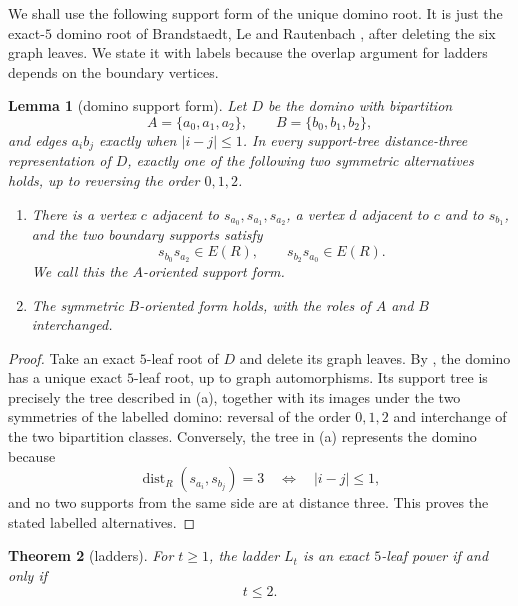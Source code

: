 \documentclass[11pt]{article}
\newtheorem{theorem}{Theorem}[section]
\newtheorem{lemma}[theorem]{Lemma}
\theoremstyle{definition}
\newcommand{\dist}{\operatorname{dist}}
\begin{document}
We shall use the following support form of the unique domino root.  It is just the exact-$5$ domino root of Brandstaedt, Le and Rautenbach \cite[Lemma~6(iii)]{BLR2010}, after deleting the six graph leaves.  We state it with labels because the overlap argument for ladders depends on the boundary vertices.

\begin{lemma}[domino support form]\label{lem:domino-support-form}
Let $D$ be the domino with bipartition
\[
 A=\{a_0,a_1,a_2\},\qquad B=\{b_0,b_1,b_2\},
\]
and edges $a_i b_j$ exactly when $|i-j|\le1$.  In every support-tree distance-three representation of $D$, exactly one of the following two symmetric alternatives holds, up to reversing the order $0,1,2$.
\begin{enumerate}[label=\textup{(\alph*)}]
\item There is a vertex $c$ adjacent to $s_{a_0},s_{a_1},s_{a_2}$, a vertex $d$ adjacent to $c$ and to $s_{b_1}$, and the two boundary supports satisfy
\[
 s_{b_0}s_{a_2}\in E(R),\qquad s_{b_2}s_{a_0}\in E(R).
\]
We call this the $A$-oriented support form.
\item The symmetric $B$-oriented form holds, with the roles of $A$ and $B$ interchanged.
\end{enumerate}
\end{lemma}

\begin{proof}
Take an exact $5$-leaf root of $D$ and delete its graph leaves.  By \cite[Lemma~6(iii)]{BLR2010}, the domino has a unique exact $5$-leaf root, up to graph automorphisms.  Its support tree is precisely the tree described in (a), together with its images under the two symmetries of the labelled domino: reversal of the order $0,1,2$ and interchange of the two bipartition classes.  Conversely, the tree in (a) represents the domino because
\[
 \dist_R(s_{a_i},s_{b_j})=3
 \quad\Longleftrightarrow\quad |i-j|\le1,
\]
and no two supports from the same side are at distance three.  This proves the stated labelled alternatives.
\end{proof}

\begin{theorem}[ladders]\label{thm:ladder}
For $t\ge1$, the ladder $L_t$ is an exact $5$-leaf power if and only if
\[
 t\le2.
\]
\end{theorem}
\end{document}
